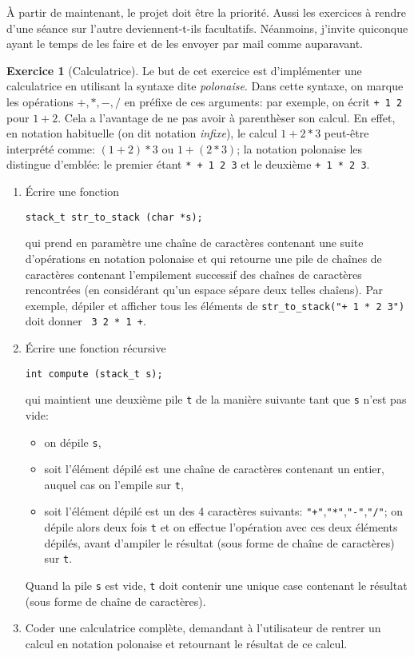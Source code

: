 \documentclass[french,a4paper]{article}
\theoremstyle{definition}
\newtheorem{exercise}{Exercice}
\theoremstyle{remark}
\newcommand{\shell}[1]{\lstinline[style={},style=sh]|#1|}
\newcommand{\inlinec}[1]{\lstinline[style=C]°#1°}
\begin{document}
\`A partir de maintenant, le projet doit être la priorité. Aussi les
exercices à rendre d'une séance sur l'autre deviennent-t-ils
facultatifs. Néanmoins, j'invite quiconque ayant le temps de les faire
et de les envoyer par mail comme auparavant.

\begin{exercise}[Calculatrice]
  Le but de cet exercice est d'implémenter une calculatrice en
  utilisant la syntaxe dite {\em polonaise}. Dans cette syntaxe, on
  marque les opérations $+,*,-,/$ en préfixe de ces arguments: par
  exemple, on écrit \shell{+ 1 2} pour $1+2$. Cela a l'avantage de ne
  pas avoir à parenthèser son calcul. En effet, en notation habituelle
  (on dit notation {\em infixe}), le calcul $1+2*3$ peut-être
  interprété comme: $(1+2)*3$ ou $1+(2*3)$; la notation polonaise les
  distingue d'emblée: le premier étant \shell{* + 1 2 3} et le
  deuxième \shell{+ 1 * 2 3}.
  \begin{enumerate}
  \item \'Ecrire une fonction
    \begin{lstlisting}
stack_t str_to_stack (char *s);
    \end{lstlisting}
    qui prend en paramètre une chaîne de caractères contenant une
    suite d'opérations en notation polonaise et qui retourne une pile
    de chaînes de caractères contenant l'empilement successif des
    chaînes de caractères rencontrées (en considérant qu'un espace
    sépare deux telles chaîens). Par exemple, dépiler et afficher tous
    les éléments de \inlinec{str_to_stack("+ 1 * 2 3")} doit donner
    \shell{ 3 2 * 1 +}.
  \item \'Ecrire une fonction récursive
    \begin{lstlisting}
int compute (stack_t s);
    \end{lstlisting}
    qui maintient une deuxième pile \inlinec{t} de la manière suivante
    tant que \inlinec{s} n'est pas vide:
    \begin{itemize}
    \item on dépile \inlinec{s},
    \item soit l'élément dépilé est une chaîne de caractères contenant
      un entier, auquel cas on l'empile sur \inlinec{t},
    \item soit l'élément dépilé est un des 4 caractères suivants:
      \inlinec{"+"},\inlinec{"*"},\inlinec{"-"},\inlinec{"/"}; on
      dépile alors deux fois \inlinec{t} et on effectue l'opération
      avec ces deux éléments dépilés, avant d'ampiler le résultat
      (sous forme de chaîne de caractères) sur \inlinec{t}.
    \end{itemize}
    Quand la pile \inlinec{s} est vide, \inlinec{t} doit contenir une
    unique case contenant le résultat (sous forme de chaîne de
    caractères).
  \item Coder une calculatrice complète, demandant à l'utilisateur de
    rentrer un calcul en notation polonaise et retournant le résultat
    de ce calcul.
  \end{enumerate}
\end{exercise}
\end{document}
